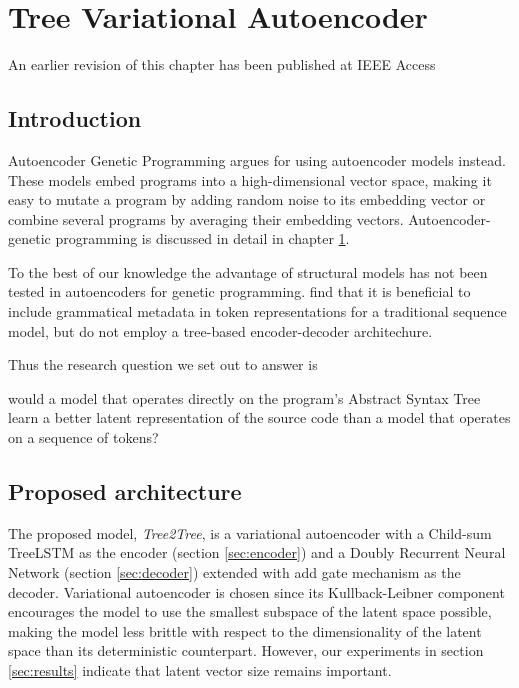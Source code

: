 \chapter{Tree Variational Autoencoder}\label{ch:tree2tree}
\begin{remark}
    An earlier revision of this chapter \cite{liventsevTreeVariationalAutoencoder2025} has been published at IEEE Access
\end{remark}

\section{Introduction}

Autoencoder Genetic Programming \cite{autoenc-gp,wittenbergDenoisingAutoencoderGenetic2023,latentspaceopt} argues for using autoencoder \cite{autoencoders} models instead.
These models embed programs into a high-dimensional vector space, making it easy to mutate a program by adding random noise to its embedding vector or combine several programs by averaging their embedding vectors.
Autoencoder-genetic programming is discussed in detail in chapter \ref{ch:tree2tree}.

To the best of our knowledge the advantage of structural models has not been tested in autoencoders for genetic programming. \cite{kusner2017grammar,grammar-vae} find that it is beneficial to include grammatical metadata in token representations for a traditional sequence model, but do not employ a tree-based encoder-decoder architechure.

Thus the research question  we set out to answer is

\begin{highlight}
    would a model that operates directly on the program's Abstract Syntax Tree learn a better latent representation of the source code than a model that operates on a sequence of tokens?
\end{highlight}

\newpage
\section{Proposed architecture}

The proposed model, \emph{Tree2Tree}, is a variational autoencoder with a Child-sum TreeLSTM as the encoder (section \ref{sec:encoder}) and a Doubly Recurrent Neural Network (section \ref{sec:decoder}) extended with add gate mechanism as the decoder.
Variational autoencoder \cite{kingma2013auto} is chosen since its Kullback-Leibner component encourages the model to use the smallest subspace of the latent space possible, making the model less brittle with respect to the dimensionality of the latent space than its deterministic counterpart.
However, our experiments in section \ref{sec:results} indicate that latent vector size remains important.

